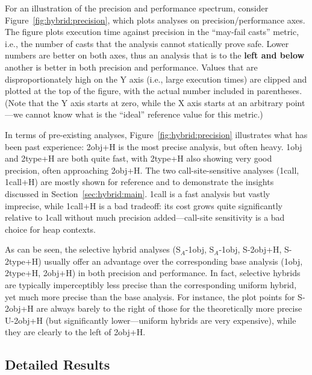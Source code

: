 For an illustration of the precision and performance spectrum, consider Figure~\ref{fig:hybrid:precision}, which plots analyses on precision/performance axes. The figure plots execution time against precision in the ``may-fail casts'' metric, i.e., the number of casts that the analysis cannot statically prove safe. Lower numbers are better on both axes, thus an analysis that is to the \textbf{left and below} another is better in both precision and performance. Values that are disproportionately high on the Y axis (i.e., large execution times) are clipped and plotted at the top of the figure, with the actual number included in parentheses. (Note that the Y axis starts at zero, while the X axis starts at an arbitrary point---we cannot know what is the ``ideal'' reference value for this metric.)

In terms of pre-existing analyses, Figure~\ref{fig:hybrid:precision} illustrates what has been past experience: 2obj+H is the most precise analysis, but often heavy. 1obj and 2type+H are both quite fast, with 2type+H also showing very good precision, often approaching 2obj+H. The two call-site-sensitive analyses (1call, 1call+H) are mostly shown for reference and to demonstrate the insights discussed in Section~\ref{sec:hybrid:main}. 1call is a fast analysis but vastly imprecise, while 1call+H is a bad tradeoff: its cost grows quite significantly relative to 1call without much precision added---call-site sensitivity is a bad choice for heap contexts.

As can be seen, the selective hybrid analyses (S$_A$-1obj, S$_A$-1obj, S-2obj+H, S-2type+H) usually offer an advantage over the corresponding base analysis (1obj, 2type+H, 2obj+H) in both precision and performance. In fact, selective hybrids are typically imperceptibly less precise than the corresponding uniform hybrid, yet much more precise than the base analysis. For instance, the plot points for S-2obj+H are always barely to the right of those for the theoretically more precise U-2obj+H (but significantly lower---uniform hybrids are very expensive), while they are clearly to the left of 2obj+H.


\subsection{Detailed Results}

